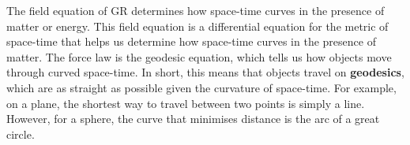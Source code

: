 \documentclass[11pt]{article}
\theoremstyle{definition}
\begin{document}
\newline
\newline
The field equation of GR determines how space-time curves in the presence of matter or energy. This field equation is a differential equation for the metric of space-time that helps us determine how space-time curves in the presence of matter. 
\newline
\newline
The force law is the geodesic equation, which tells us how objects move through curved space-time. In short, this means that objects travel on \textbf{geodesics}, which are as straight as possible given the curvature of space-time. For example, on a plane, the shortest way to travel between two points is simply a line. However, for a sphere, the curve that minimises distance is the arc of a great circle. 
\end{document}
